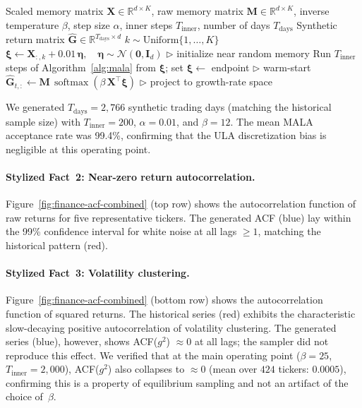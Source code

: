 \begin{algorithm}[h]
\caption{MALA Warm-Start Sequential Return Generation}\label{alg:mala-sequential}
\begin{algorithmic}[1]
\REQUIRE Scaled memory matrix $\mathbf{X}\in\mathbb{R}^{d\times K}$, raw memory matrix $\mathbf{M}\in\mathbb{R}^{d\times K}$, inverse temperature $\beta$, step size $\alpha$, inner steps $T_{\text{inner}}$, number of days $T_{\text{days}}$
\ENSURE Synthetic return matrix $\hat{\mathbf{G}}\in\mathbb{R}^{T_{\text{days}}\times d}$
\STATE $k \sim \mathrm{Uniform}\{1,\dots,K\}$
\STATE $\boldsymbol{\xi} \leftarrow \mathbf{X}_{:,k} + 0.01\,\boldsymbol{\eta}, \quad \boldsymbol{\eta}\sim\mathcal{N}(\mathbf{0},\mathbf{I}_d)$ \hfill $\triangleright$ initialize near random memory
    \STATE Run $T_{\text{inner}}$ steps of Algorithm~\ref{alg:mala} from $\boldsymbol{\xi}$; set $\boldsymbol{\xi} \leftarrow$ endpoint \hfill $\triangleright$ warm-start
    \STATE $\hat{\mathbf{G}}_{t,:} \leftarrow \mathbf{M}\,\operatorname{softmax}(\beta\,\mathbf{X}^{\top}\boldsymbol{\xi})$ \hfill $\triangleright$ project to growth-rate space
\ENDFOR
\end{algorithmic}
\end{algorithm}

We generated $T_{\text{days}} = 2{,}766$ synthetic trading days (matching the historical sample size) with $T_{\text{inner}} = 200$, $\alpha = 0.01$, and $\beta = 12$. The mean MALA acceptance rate was 99.4\%, confirming that the ULA discretization bias is negligible at this operating point.

\paragraph{Stylized Fact~2: Near-zero return autocorrelation.}
Figure~\ref{fig:finance-acf-combined} (top row) shows the autocorrelation function of raw returns for five representative tickers. The generated ACF (blue) lay within the 99\% confidence interval for white noise at all lags $\geq 1$, matching the historical pattern (red).

\paragraph{Stylized Fact~3: Volatility clustering.}
Figure~\ref{fig:finance-acf-combined} (bottom row) shows the autocorrelation function of squared returns. The historical series (red) exhibits the characteristic slow-decaying positive autocorrelation of volatility clustering. The generated series (blue), however, shows ACF($g^2$) $\approx 0$ at all lags; the sampler did not reproduce this effect. We verified that at the main operating point ($\beta{=}25$, $T_{\text{inner}}{=}2{,}000$), ACF($g^2$) also collapses to ${\approx}0$ (mean over $424$ tickers: $0.0005$), confirming this is a property of equilibrium sampling and not an artifact of the choice of~$\beta$.

